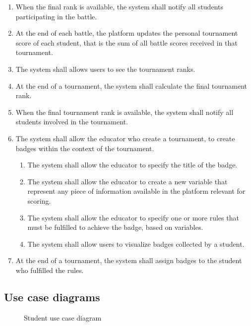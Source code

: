 \begin{enumerate}[label=\textbf{R\arabic*}:,leftmargin=1.3cm]
      \item When the final rank is available, the system shall notify all students participating in the battle.
      \item At the end of each battle, the platform updates the personal tournament score of each student, that is the sum of all battle scores received in that tournament.
      \item The system shall allows users to see the tournament ranks.
      \item At the end of a tournament, the system shall calculate the final tournament rank.
      \item When the final tournament rank is available, the system shall notify all students involved in the tournament.
      \item The system shall allow the educator who create a tournament, to create badges within the context of the tournament.
            \begin{enumerate}[label=\textbf{R\arabic{enumi}.\arabic*}:, leftmargin=*]
                  \item The system shall allow the educator to specify the title of the badge.
                  \item The system shall allow the educator to create a new variable that represent any piece of information available in the platform relevant for scoring.
                  \item The system shall allow the educator to specify one or more rules that must be fulfilled to achieve the badge, based on variables.
                  \item The system shall allow users to visualize badges collected by a student.
            \end{enumerate}
      \item At the end of a tournament, the system shall assign badges to the student who fulfilled the rules.
\end{enumerate}
\subsection{Use case diagrams}
\begin{figure}[H]
      \centering
      \caption{Student use case diagram}
      \label{fig:Student use case diagram}
\end{figure}


